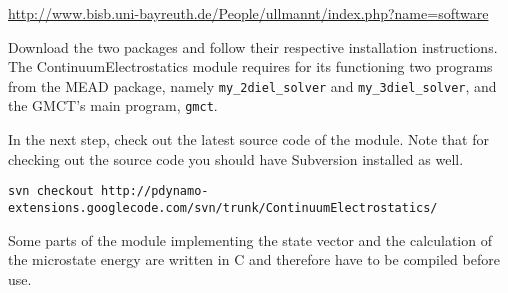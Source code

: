 \documentclass[a4paper,11pt]{article}
\newcommand{\modulename}{ContinuumElectrostatics\xspace}
\begin{document}
\url{http://www.bisb.uni-bayreuth.de/People/ullmannt/index.php?name=software}

Download the two packages and follow their respective installation
instructions.
%
The \modulename module requires for its functioning two programs
from the MEAD package, namely \texttt{my\_2diel\_solver} and \texttt{my\_3diel\_solver},
and the GMCT's main program, \texttt{gmct}.

\bigskip
In the next step, check out the latest source code of the module.
%
Note that for checking out the source code you should have Subversion installed
as well.

{\footnotesize \begin{lstlisting}
svn checkout http://pdynamo-extensions.googlecode.com/svn/trunk/ContinuumElectrostatics/
\end{lstlisting} }

\bigskip
Some parts of the module implementing the state vector and the calculation of the microstate energy
are written in C and therefore have to be compiled before use. 
\end{document}
